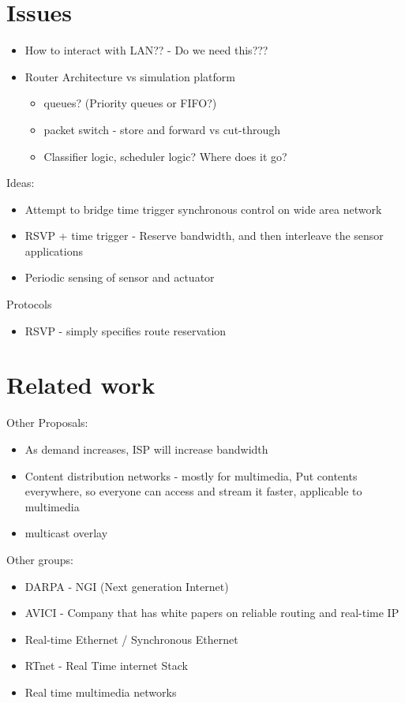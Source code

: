 \documentclass[times, 10pt,twocolumn]{article}
\begin{document}
\section{Issues}
\begin{itemize}
\item How to interact with LAN?? - Do we need this???
\item Router Architecture vs simulation platform
\begin{itemize}
\item queues? (Priority queues or FIFO?)
\item packet switch - store and forward vs cut-through
\item Classifier logic, scheduler logic? Where does it go? 
\end{itemize}
 
\end{itemize}


Ideas:
\begin{itemize}
\item Attempt to bridge time trigger synchronous control on wide area network
\item RSVP + time trigger - Reserve bandwidth, and then interleave the sensor applications
\item Periodic sensing of sensor and actuator
\end{itemize}

Protocols
\begin{itemize}
\item RSVP - simply specifies route reservation
\end{itemize}   

\section{Related work}

Other Proposals:
\begin{itemize}
\item As demand increases, ISP will increase bandwidth
\item Content distribution networks - mostly for multimedia, Put contents everywhere, so everyone can access and stream it faster, applicable to multimedia
\item multicast overlay
\end{itemize}

Other groups:
\begin{itemize}
\item DARPA - NGI (Next generation Internet)
\item AVICI - Company that has white papers on reliable routing and real-time IP
\item Real-time Ethernet / Synchronous Ethernet
\item RTnet - Real Time internet Stack
\item Real time multimedia networks
\end{itemize}
\end{document}
